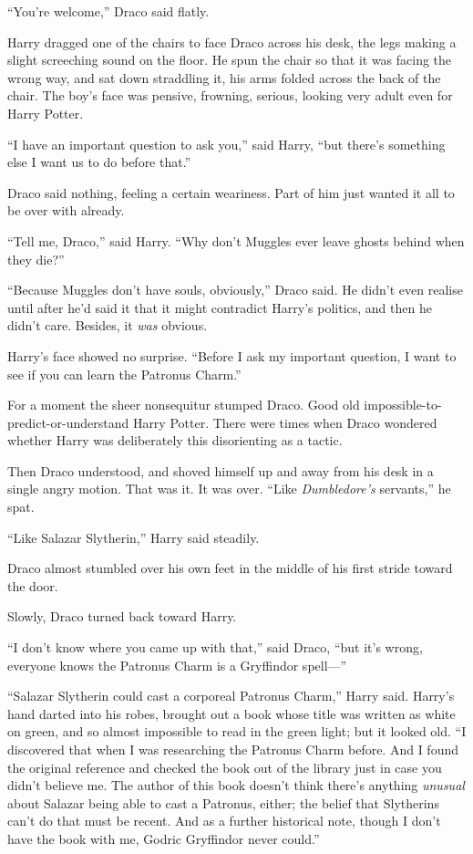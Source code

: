 ``You're welcome,'' Draco said flatly.

Harry dragged one of the chairs to face Draco across his desk, the legs
making a slight screeching sound on the floor. He spun the chair so that
it was facing the wrong way, and sat down straddling it, his arms folded
across the back of the chair. The boy's face was pensive, frowning,
serious, looking very adult even for Harry Potter.

``I have an important question to ask you,'' said Harry, ``but there's
something else I want us to do before that.''

Draco said nothing, feeling a certain weariness. Part of him just wanted
it all to be over with already.

``Tell me, Draco,'' said Harry. ``Why don't Muggles ever leave ghosts
behind when they die?''

``Because Muggles don't have souls, obviously,'' Draco said. He didn't
even realise until after he'd said it that it might contradict Harry's
politics, and then he didn't care. Besides, it \emph{was} obvious.

Harry's face showed no surprise. ``Before I ask my important question, I
want to see if you can learn the Patronus Charm.''

For a moment the sheer nonsequitur stumped Draco. Good old
impossible-to-predict-or-understand Harry Potter. There were times when
Draco wondered whether Harry was deliberately this disorienting as a
tactic.

Then Draco understood, and shoved himself up and away from his desk in a
single angry motion. That was it. It was over. ``Like
\emph{Dumbledore's} servants,'' he spat.

``Like Salazar Slytherin,'' Harry said steadily.

Draco almost stumbled over his own feet in the middle of his first
stride toward the door.

Slowly, Draco turned back toward Harry.

``I don't know where you came up with that,'' said Draco, ``but it's
wrong, everyone knows the Patronus Charm is a Gryffindor spell---''

``Salazar Slytherin could cast a corporeal Patronus Charm,'' Harry said.
Harry's hand darted into his robes, brought out a book whose title was
written as white on green, and so almost impossible to read in the green
light; but it looked old. ``I discovered that when I was researching the
Patronus Charm before. And I found the original reference and checked
the book out of the library just in case you didn't believe me. The
author of this book doesn't think there's anything \emph{unusual} about
Salazar being able to cast a Patronus, either; the belief that
Slytherins can't do that must be recent. And as a further historical
note, though I don't have the book with me, Godric Gryffindor never
could.''


